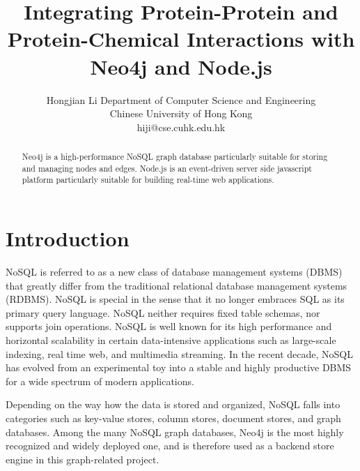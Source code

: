 \documentclass[10pt, conference, compsocconf]{../IEEEtran}
\begin{document}
\title{Integrating Protein-Protein and Protein-Chemical Interactions with Neo4j and Node.js} %
\author
{
\IEEEauthorblockN
{
Hongjian Li
\IEEEauthorblockA
{
Department of Computer Science and Engineering\\
Chinese University of Hong Kong\\
hiji@cse.cuhk.edu.hk
}
}
}
\maketitle

\begin{abstract}

Neo4j is a high-performance NoSQL graph database particularly suitable for storing and managing nodes and edges. Node.js is an event-driven server side javascript platform particularly suitable for building real-time web applications. 

\end{abstract}




\section{Introduction}

NoSQL is referred to as a new class of database management systems (DBMS) that greatly differ from the traditional relational database management systems (RDBMS). NoSQL is special in the sense that it no longer embraces SQL as its primary query language. NoSQL neither requires fixed table schemas, nor supports join operations. NoSQL is well known for its high performance and horizontal scalability in certain data-intensive applications such as large-scale indexing, real time web, and multimedia streaming. In the recent decade, NoSQL has evolved from an experimental toy into a stable and highly productive DBMS for a wide spectrum of modern applications.

Depending on the way how the data is stored and organized, NoSQL falls into categories such as key-value stores, column stores, document stores, and graph databases. Among the many NoSQL graph databases, Neo4j \citep{1076} is the most highly recognized and widely deployed one, and is therefore used as a backend store engine in this graph-related project.
\end{document}
